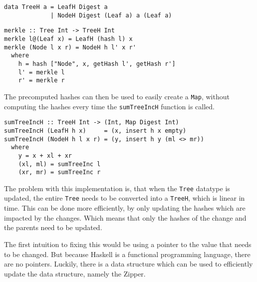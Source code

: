 \begin{verbatim}
data TreeH a = LeafH Digest a
             | NodeH Digest (Leaf a) a (Leaf a)
\end{verbatim}

\begin{verbatim}
merkle :: Tree Int -> TreeH Int
merkle l@(Leaf x) = LeafH (hash l) x
merkle (Node l x r) = NodeH h l' x r'
  where
    h = hash ["Node", x, getHash l', getHash r']
    l' = merkle l
    r' = merkle r
\end{verbatim}

The precomputed hashes can then be used to easily create a \texttt{Map}, without computing the hashes every time the \texttt{sumTreeIncH} function is called.

\begin{verbatim}
sumTreeIncH :: TreeH Int -> (Int, Map Digest Int)
sumTreeIncH (LeafH h x)     = (x, insert h x empty)
sumTreeIncH (NodeH h l x r) = (y, insert h y (ml <> mr))
  where
    y = x + xl + xr
    (xl, ml) = sumTreeInc l
    (xr, mr) = sumTreeInc r
\end{verbatim}

The problem with this implementation is, that when the \texttt{Tree} datatype is updated, the entire \texttt{Tree} needs to be converted into a \texttt{TreeH}, which is linear in time. This can be done more efficiently, by only updating the hashes which are impacted by the changes. Which means that only the hashes of the change and the parents need to be updated. 

The first intuition to fixing this would be using a pointer to the value that needs to be changed. But because Haskell is a functional programming language, there are no pointers. Luckily, there is a data structure which can be used to efficiently update the data structure, namely the Zipper\cite{huet1997zipper}.

